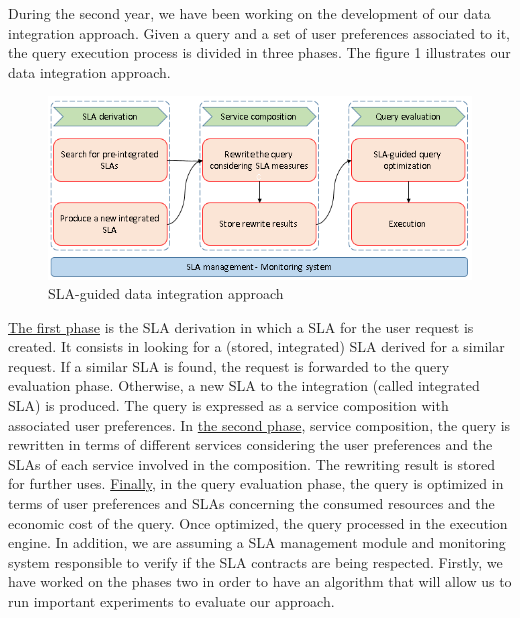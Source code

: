 \documentclass[11pt,a4paper,oneside]{report}
\begin{document}
During the second year, we have been working on the development of our data integration approach. Given a query and a set of user preferences associated to it, the query execution process is divided in three phases. The figure 1 illustrates our data integration approach.

\begin{figure}[h!]
\center
\includegraphics[scale=0.7]{../../general_approach.PNG} 
\caption{SLA-guided data integration approach}
\end{figure}

\underline{The first phase} is the SLA derivation in which a SLA for the user request is created. It consists in looking for a (stored, integrated) SLA derived for a similar request. If a similar SLA is found, the request is forwarded to the query evaluation phase. Otherwise, a new SLA to the integration (called integrated SLA) is produced. The query is expressed as a service composition with associated user preferences. In \underline{the second phase}, service composition, the query is rewritten in terms of different services considering the user preferences and the SLAs of each service involved in the composition. The rewriting result is stored for further uses. \underline{Finally}, in the query evaluation phase, the query is optimized in terms of user preferences and SLAs concerning the consumed resources and the economic cost of the query. Once optimized, the query processed in the execution engine. In addition, we are assuming a SLA management module and monitoring system responsible to verify if the SLA contracts are being respected. Firstly, we have worked on the phases two in order to have an algorithm that will allow us to run important experiments to evaluate our approach. 
	
\end{document}
